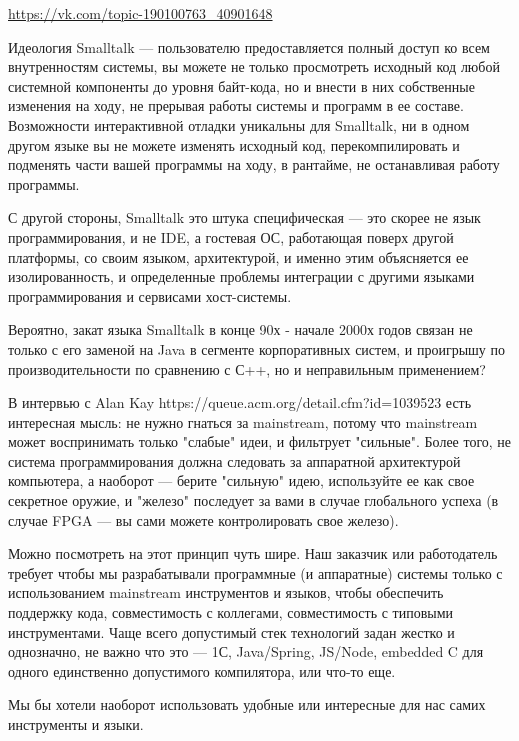 \url{https://vk.com/topic-190100763_40901648}


Идеология Smalltalk — пользователю предоставляется полный доступ ко всем внутренностям системы, вы можете не только просмотреть исходный код любой системной компоненты до уровня байт-кода, но и внести в них собственные изменения на ходу, не прерывая работы системы и программ в ее составе. Возможности интерактивной отладки уникальны для Smalltalk, ни в одном другом языке вы не можете изменять исходный код, перекомпилировать и подменять части вашей программы на ходу, в рантайме, не останавливая работу программы.

С другой стороны, Smalltalk это штука специфическая — это скорее не язык программирования, и не IDE, а гостевая ОС, работающая поверх другой платформы, со своим языком, архитектурой, и именно этим объясняется ее изолированность, и определенные проблемы интеграции с другими языками программирования и сервисами хост-системы.

Вероятно, закат языка Smalltalk в конце 90х - начале 2000х годов связан не только с его заменой на Java в сегменте корпоративных систем, и проигрышу по производительности по сравнению с С++, но и неправильным применением?

\clearpage

В интервью с Alan Kay https://queue.acm.org/detail.cfm?id=1039523 есть интересная мысль: не нужно гнаться за mainstream, потому что mainstream может воспринимать только "слабые" идеи, и фильтрует "сильные". Более того, не система программирования должна следовать за аппаратной архитектурой компьютера, а наоборот — берите "сильную" идею, используйте ее как свое секретное оружие, и "железо" последует за вами в случае глобального успеха (в случае FPGA — вы сами можете контролировать свое железо).

Можно посмотреть на этот принцип чуть шире. Наш заказчик или работодатель требует чтобы мы разрабатывали программные (и аппаратные) системы только с использованием mainstream инструментов и языков, чтобы обеспечить поддержку кода, совместимость с коллегами, совместимость с типовыми инструментами. Чаще всего допустимый стек технологий задан жестко и однозначно, не важно что это — 1С, Java/Spring, JS/Node, embedded C для одного единственно допустимого компилятора, или что-то еще.

Мы бы хотели наоборот использовать удобные или интересные для нас самих инструменты и языки.

